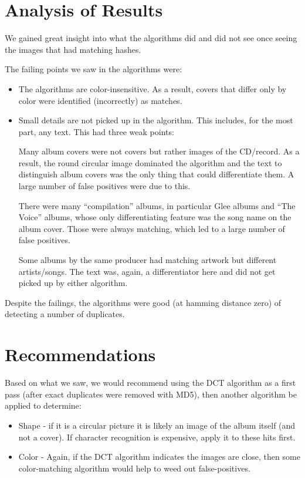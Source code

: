 \documentclass[11pt,a4paper,titlepage]{article}
\begin{document}
\section{Analysis of Results}

We gained great insight into what the algorithms did and did not see once
seeing the images that had matching hashes.

The failing points we saw in the algorithms were:

\begin{itemize}
    \item
        The algorithms are color-insensitive.  As a result, covers that differ
        only by color were identified (incorrectly) as matches.

    \item
        Small details are not picked up in the algorithm.  This includes, for
        the most part, any text.  This had three weak points:

        Many album covers were not covers but rather images of the
        CD/record.  As a result, the round circular image dominated the
        algorithm and the text to distinguish album covers was the only
        thing that could differentiate them.  A large number of false
        positives were due to this.

        There were many ``compilation'' albums, in particular Glee
        albums and ``The Voice'' albums, whose only differentiating
        feature was the song name on the album cover.  Those were
        always matching, which led to a large number of false
        positives.

        Some albums by the same producer had matching artwork but
        different artists/songs.  The text was, again, a differentiator
        here and did not get picked up by either algorithm.
\end{itemize}

Despite the failings, the algorithms were good (at hamming distance zero) of
detecting a number of duplicates.

\section{Recommendations}

Based on what we saw, we would recommend using the DCT algorithm as a first
pass (after exact duplicates were removed with MD5), then another algorithm be
applied to determine:

\begin{itemize}
    \item
        Shape - if it is a circular picture it is likely an image of the album
        itself (and not a cover).  If character recognition is expensive, apply
        it to these hits first.
    \item
        Color - Again, if the DCT algorithm indicates the images are close,
        then some color-matching algorithm would help to weed out
        false-positives.
\end{itemize}
\end{document}
